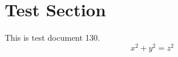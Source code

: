 \documentclass{article}
\begin{document}
\section{Test Section}
This is test document 130.
\begin{equation}
x^2 + y^2 = z^2
\end{equation}
\end{document}
